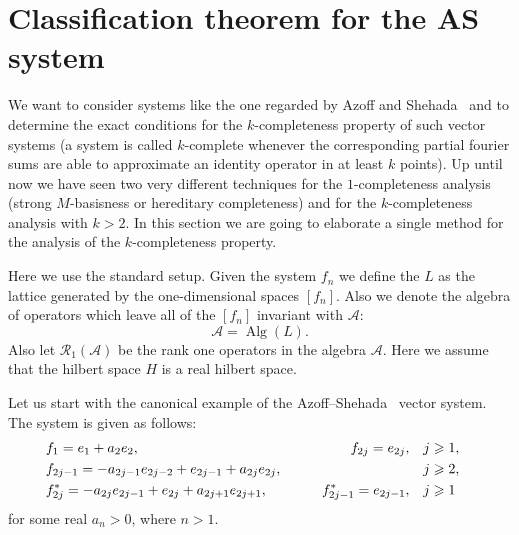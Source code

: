 \documentclass[12pt]{article}
\renewcommand{\cal}[1]{\mathcal{#1}}
\renewcommand{\geq}{\geqslant}
\theoremstyle{definition}
\numberwithin{remark}{section}
\numberwithin{theorem}{section}
\numberwithin{prop}{section}
\numberwithin{equation}{section}
\numberwithin{lemma}{section}
\numberwithin{prop_under_lemma}{lemma}
\begin{document}

  \section*{Classification theorem for the AS system}
    We want to consider systems like the one regarded by Azoff and Shehada~\cite{azoff} and to determine the exact conditions for the $k$-completeness property
    of such vector systems (a system is called $k$-complete whenever the corresponding partial fourier sums are able to approximate an identity operator in at least $k$ points). Up until now we have seen two very different techniques for the 
    $1$-completeness analysis (strong $M$-basisness or hereditary completeness) and for the $k$-completeness analysis with $k>2$. In this section we are going to elaborate a single method for the analysis of the $k$-completeness property.
    
    Here we use the standard setup. Given the system $f_n$ we define the $L$ as the lattice generated by the one-dimensional spaces $[f_n]$. Also we denote
    the algebra of operators which leave all of the $[f_n]$ invariant with $\cal{A}$:
    $$\cal{A} = \operatorname{Alg}(L).$$
    Also let $\cal{R}_1(\cal{A})$ be the rank one operators in the algebra $\cal{A}$.
    Here we assume that the hilbert space $H$ is a real hilbert space.
    
    Let us start with the canonical example of the Azoff--Shehada~\cite{azoff} vector system. The system is given as follows:
    \begin{equation}
        \label{as-system}
        \begin{aligned}
          &f_1 = e_1 + a_2 e_2, \qquad &f_{2j}=e_{2j}, \quad&j \geq 1,&\\
          &f_{2j-1}=-a_{2j-1}e_{2j-2} + e_{2j-1} + a_{2j}e_{2j}, \qquad &\makebox[5em]{} \quad&j \geq 2,&\\
          &f^*_{2j}=-a_{2j}e_{2j-1}+e_{2j}+a_{2j+1}e_{2j+1}, \qquad &f^*_{2j-1}=e_{2j-1}, \quad&j \geq 1&
        \end{aligned}
    \end{equation}
    for some real $a_n > 0$, where $n > 1$.
    
\end{document}
